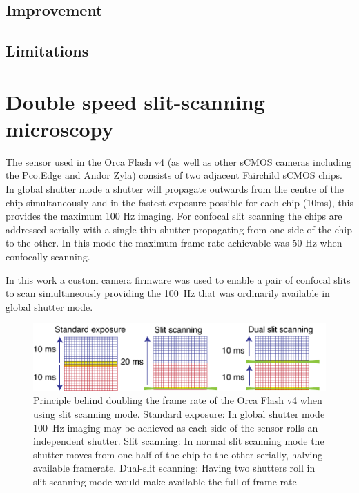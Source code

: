 \subsection{Improvement} %

\subsection{Limitations} %
\section{Double speed slit-scanning microscopy}

The sensor used in the Orca Flash v4 (as well as other sCMOS cameras including the Pco.Edge and Andor Zyla) consists of two adjacent Fairchild sCMOS chips.
In global shutter mode a shutter will propagate outwards from the centre of the chip simultaneously and in the fastest exposure possible for each chip (10ms), this provides the maximum 100 Hz imaging.
For confocal slit scanning the chips are addressed serially with a single thin shutter propagating from one side of the chip to the other.
In this mode the maximum frame rate achievable was 50 Hz when confocally scanning.

In this work a custom camera firmware was used to enable a pair of confocal slits to scan simultaneously providing the \SI{100}{\hertz} that was ordinarily available in global shutter mode.

\begin{figure}
  \centering
  \includegraphics{dual_slit_scanning}
  \caption{
  Principle behind doubling the frame rate of the Orca Flash v4 when using slit scanning mode.
  Standard exposure: In global shutter mode \SI{100}{\hertz} imaging may be achieved as each side of the sensor rolls an independent shutter.
  Slit scanning: In normal slit scanning mode the shutter moves from one half of the chip to the other serially, halving available framerate.
  Dual-slit scanning:
  Having two shutters roll in slit scanning mode would make available the full of frame rate
  }
  \label{fig:dual_slit_scanning}
\end{figure}


